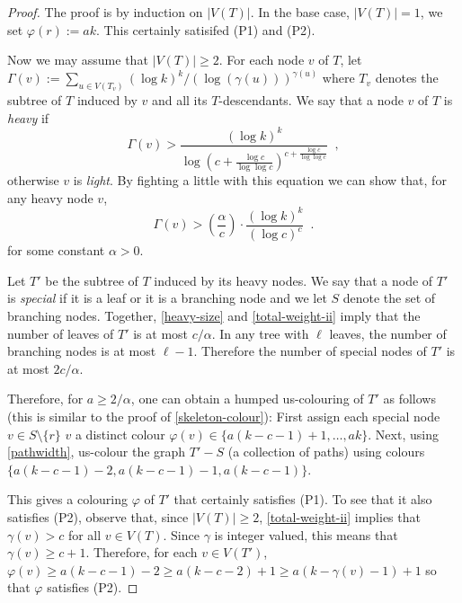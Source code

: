 \documentclass[kpfonts]{patmorin}
\begin{document}
\begin{proof}
    The proof is by induction on $|V(T)|$. In the base case, $|V(T)|=1$, we set $\varphi(r):=ak$.  This certainly satisifed (P1) and (P2).

    Now we may assume that $|V(T)|\ge 2$.  For each node $v$ of $T$, let $\Gamma(v):=\sum_{u\in V(T_v)}(\log k)^k/(\log(\gamma(u)))^{\gamma(u)}$ where $T_v$ denotes the subtree of $T$ induced by $v$ and all its $T$-descendants.  We say that a node $v$ of $T$ is \emph{heavy} if
    \[
        \Gamma(v)> \frac{(\log k)^k}{\log\left(c+\frac{\log c}{\log\log c}\right)^{c+\frac{\log c}{\log\log c}}} \enspace ,
    \]
    otherwise $v$ is \emph{light}.
    By fighting a little with this equation we can show that, for any heavy node $v$,
    \begin{equation}
        \Gamma(v) > \left(\frac{\alpha}{c}\right)\cdot
            \frac{(\log k)^k}{(\log c)^c} \enspace . \label{heavy-size}
    \end{equation}
    for some constant $\alpha > 0$.

    Let $T'$ be the subtree of $T$ induced by its heavy nodes.  We say that a node of $T'$ is \emph{special} if it is a leaf or it is a branching node and we let $S$ denote the set of branching nodes.  Together, \cref{heavy-size} and \cref{total-weight-ii} imply that the number of leaves of $T'$ is at most $c/\alpha$.  In any tree with $\ell$ leaves, the number of branching nodes is at most $\ell-1$.  Therefore the number of special nodes of $T'$ is at most $2c/\alpha$.

    Therefore, for $a\ge 2/\alpha$, one can obtain a humped us-colouring of $T'$ as follows (this is similar to the proof of \cref{skeleton-colour}):  First assign each special node $v\in S\setminus\{r\}$ $v$ a distinct colour $\varphi(v)\in\{a(k-c-1)+1,\ldots,ak\}$.  Next, using \cref{pathwidth}, us-colour the graph $T'-S$ (a collection of paths) using colours $\{a(k-c-1)-2,a(k-c-1)-1,a(k-c-1)\}$.

    This gives a colouring $\varphi$ of $T'$ that certainly satisfies (P1).  To see that it also satisfies (P2), observe that, since $|V(T)|\ge 2$, \cref{total-weight-ii} implies that $\gamma(v) > c$ for all $v\in V(T)$. Since $\gamma$ is integer valued, this means that $\gamma(v)\ge c+1$.  Therefore, for each $v\in V(T')$, $\varphi(v)\ge a(k-c-1)-2 \ge a(k-c-2)+1\ge a(k-\gamma(v)-1)+1$ so that $\varphi$ satisfies (P2).


\end{proof}
\end{document}
